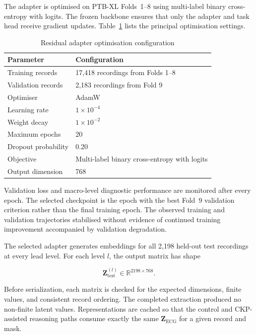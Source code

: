 \documentclass{ssnreview}
\begin{document}
The adapter is optimised on PTB-XL Folds~1--8 using multi-label binary cross-entropy
with logits. The frozen backbone ensures that only the adapter and task head receive
gradient updates. Table~\ref{tab:adapter-config} lists the principal optimisation settings.

\begin{table}[H]
  \centering
  \caption{Residual adapter optimisation configuration}
  \label{tab:adapter-config}
  \begin{tabularx}{0.88\textwidth}{@{}lX@{}}
    \toprule
    \textbf{Parameter} & \textbf{Configuration} \\
    \midrule
    Training records & 17,418 recordings from Folds 1--8 \\
    Validation records & 2,183 recordings from Fold 9 \\
    Optimiser & AdamW \\
    Learning rate & $1\times10^{-4}$ \\
    Weight decay & $1\times10^{-2}$ \\
    Maximum epochs & 20 \\
    Dropout probability & 0.20 \\
    Objective & Multi-label binary cross-entropy with logits \\
    Output dimension & 768 \\
    \bottomrule
  \end{tabularx}
\end{table}

Validation loss and macro-level diagnostic performance are monitored after every epoch.
The selected checkpoint is the epoch with the best Fold~9 validation criterion rather than
the final training epoch. The observed training and validation trajectories stabilised
without evidence of continued training improvement accompanied by validation degradation.

The selected adapter generates embeddings for all 2,198 held-out test recordings at every
lead level. For each level $l$, the output matrix has shape

\begin{equation}
  \mathbf{Z}^{(l)}_{\mathrm{test}}\in\mathbb{R}^{2198\times768}.
\end{equation}

Before serialization, each matrix is checked for the expected dimensions, finite values,
and consistent record ordering. The completed extraction produced no non-finite latent
values. Representations are cached so that the control and CKP-assisted reasoning paths
consume exactly the same $\mathbf{Z}_{\mathrm{ECG}}$ for a given record and mask.
\end{document}
